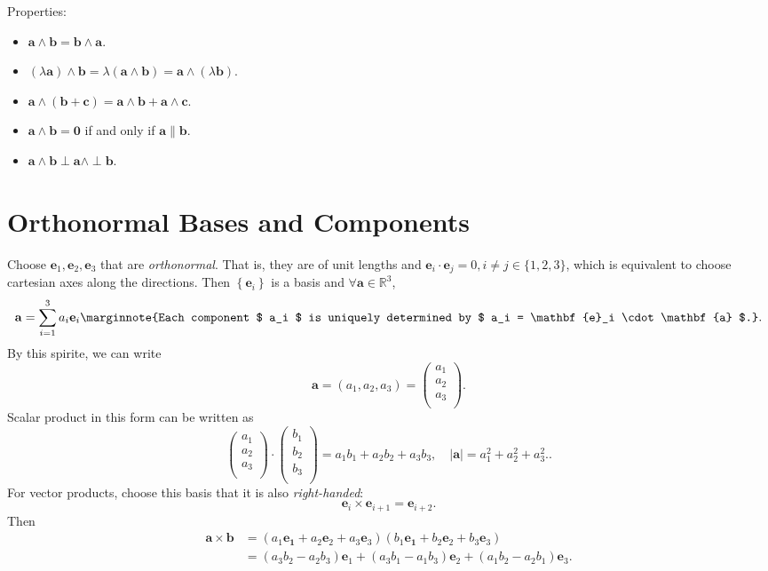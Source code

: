 \documentclass[10pt]{article}
\begin{document}
    Properties:
    \begin{itemize}
        \item $ \mathbf{a} \wedge \mathbf{b}=\mathbf{b}\wedge \mathbf{a} $.
        \item $ (\lambda \mathbf{a})\wedge \mathbf{b}=\lambda(\mathbf{a}\wedge \mathbf{b})=\mathbf{a} \wedge (\lambda\mathbf{b}) $.
        \item $ \mathbf{a}\wedge (\mathbf{b}+\mathbf{c})=\mathbf{a}\wedge \mathbf{b}+\mathbf{a}\wedge \mathbf{c} $.
        \item $ \mathbf{a} \wedge \mathbf{b}=\mathbf{0} $ if and only if $ \mathbf{a} \parallel \mathbf{b} $.
        \item $ \mathbf{a}\wedge \mathbf{b} \perp \mathbf{a} \land \perp \mathbf{b} $.
    \end{itemize}
    \section{Orthonormal Bases and Components}
    Choose $ \mathbf{e}_1, \mathbf{e}_2, \mathbf{e}_3 $ that are \textit{orthonormal}. That is, they are of unit lengths and $ \mathbf{e}_i\cdot \mathbf{e}_j =0, i\neq j\in \{1,2,3\}$, which is equivalent to choose cartesian axes along the directions. Then $ \left\{ \mathbf{e}_i\right\} $ is a basis and $ \forall \mathbf{a}\in \mathbb{R}^3 $, 
    \[
        \mathbf{a}=\sum_{i=1}^{3}a_i \mathbf{e}_i \marginnote{Each component $ a_i $ is uniquely determined by $ a_i = \mathbf{e}_i \cdot \mathbf{a} $.}
    .\]
    By this spirite, we can write 
    \[
        \mathbf{a} = (a_1,a_2,a_3) = \begin{pmatrix}
            a_1\\ 
            a_2\\ 
            a_3\\
            \end{pmatrix}
    .\]
    Scalar product in this form can be written as 
    \[
        \begin{pmatrix}
            a_1\\ 
            a_2\\ 
            a_3\\
            \end{pmatrix} \cdot \begin{pmatrix}
                b_1\\ 
                b_2\\ 
                b_3\\
                \end{pmatrix}
                =a_1b_1+a_2b_2+a_3b_3,\quad \left| \mathbf{a} \right| = a_1^2+a_2^2+a_3^2.
    .\]
    For vector products, choose this basis that it is also \textit{right-handed}:
    \[
        \mathbf{e}_i \times \mathbf{e}_{i+1}=\mathbf{e}_{i+2}
    .\]
    Then
    \[
        \begin{aligned}
            \mathbf{a}\times \mathbf{b} &= (a_1 \mathbf{e_1}+a_2 \mathbf{e}_2+a_3 \mathbf{e}_3)(b_1 \mathbf{e_1}+b_2 \mathbf{e}_2+b_3 \mathbf{e}_3)\\
            &= (a_3b_2-a_2b_3)\mathbf{e}_1+(a_3b_1-a_1b_3)\mathbf{e}_2+(a_1b_2-a_2b_1)\mathbf{e}_3.
        \end{aligned}
    \]
\end{document}
